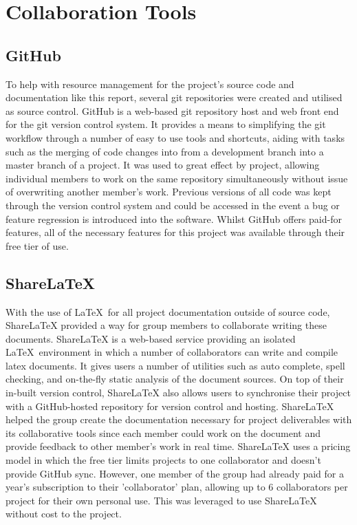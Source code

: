 \section{Collaboration Tools}
    \subsection{GitHub}
    
        To help with resource management for the project's source code and documentation like this report, several git repositories were created and utilised as source control. GitHub is a web-based git repository host and web front end for the git version control system. It provides a means to simplifying the git workflow through a number of easy to use tools and shortcuts, aiding with tasks such as the merging of code changes into from a development branch into a master branch of a project. It was used to great effect by project, allowing individual members to work on the same repository simultaneously without issue of overwriting another member's work. Previous versions of all code was kept through the version control system and could be accessed in the event a bug or feature regression is introduced into the software. Whilst GitHub offers paid-for features, all of the necessary features for this project was available through their free tier of use.
    
    \subsection{ShareLaTeX}
    
        With the use of \LaTeX~for all project documentation outside of source code, ShareLaTeX provided a way for group members to collaborate writing these documents. ShareLaTeX is a web-based service providing an isolated \LaTeX~environment in which a number of collaborators can write and compile latex documents. It gives users a number of utilities such as auto complete, spell checking, and on-the-fly static analysis of the document sources. On top of their in-built version control, ShareLaTeX also allows users to synchronise their project with a GitHub-hosted repository for version control and hosting. ShareLaTeX helped the group create the documentation necessary for project deliverables with its collaborative tools since each member could work on the document and provide feedback to other member's work in real time. ShareLaTeX uses a pricing model in which the free tier limits projects to one collaborator and doesn't provide GitHub sync. However, one member of the group had already paid for a year's subscription to their 'collaborator' plan, allowing up to 6 collaborators per project for their own personal use. This was leveraged to use ShareLaTeX without cost to the project.
    
